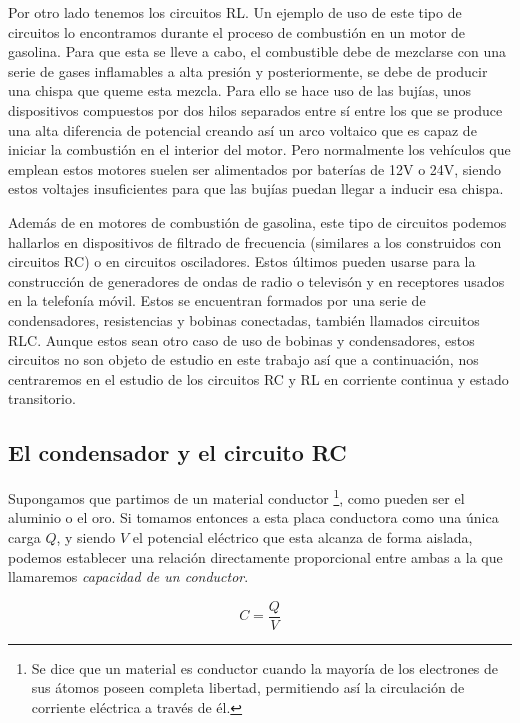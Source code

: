 \documentclass[../main.tex]{subfiles}
\begin{document}
Por otro lado tenemos los circuitos RL. Un ejemplo de uso de este tipo de circuitos lo encontramos durante el proceso de combustión en un motor de gasolina. Para que esta se lleve a cabo, el combustible debe de mezclarse con una serie de gases inflamables a alta presión y posteriormente, se debe de producir una chispa que queme esta mezcla. Para ello se hace uso de las bujías, unos dispositivos compuestos por dos hilos separados entre sí entre los que se produce una alta diferencia de potencial creando así un arco voltaico que es capaz de iniciar la combustión en el interior del motor. Pero normalmente los vehículos que emplean estos motores suelen ser alimentados por baterías de 12V o 24V, siendo estos voltajes insuficientes para que las bujías puedan llegar a inducir esa chispa.

Además de en motores de combustión de gasolina, este tipo de circuitos podemos hallarlos en dispositivos de filtrado de frecuencia (similares a los construidos con circuitos RC) o en circuitos osciladores. Estos últimos pueden usarse para la construcción de generadores de ondas de radio o televisón y en receptores usados en la telefonía móvil. Estos se encuentran formados por una serie de condensadores, resistencias y bobinas conectadas, también llamados circuitos RLC. Aunque estos sean otro caso de uso de bobinas y condensadores, estos circuitos no son objeto de estudio en este trabajo así que a continuación, nos centraremos en el estudio de los circuitos RC y RL en corriente continua y estado transitorio.




\subsection{El condensador y el circuito RC}
Supongamos que partimos de un material conductor \footnote{Se dice que un material es conductor cuando la mayoría de los electrones de sus átomos poseen completa libertad, permitiendo así la circulación de corriente eléctrica a través de él.}, como pueden ser el aluminio o el oro. Si tomamos entonces a esta placa conductora \cite{tipler} como una única carga $Q$, y siendo $V$ el potencial eléctrico que esta alcanza de forma aislada, podemos establecer una relación directamente proporcional entre ambas a la que llamaremos \textit{capacidad de un conductor}. 

\begin{equation}
    \label{def::capacidad_conductor}
    C = \frac{Q}{V}
\end{equation}
\end{document}
